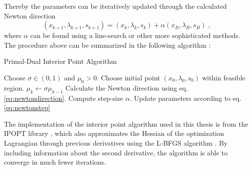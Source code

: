 Thereby the parameters can be iteratively updated through the calculated Newton direction
\begin{equation}
	(x_{k+1} , \lambda_{k+1} , s _{k+1}) = (x_{k} , \lambda_{k} , s _{k}) + \alpha  (x_B , \lambda_B , s_B) \; , \label{eq:newtonstep}
\end{equation}
where $\alpha$ can be found using a line-search or other more sophisticated methods.
The procedure above can be summarized in the following algorithm \cite{ipnote}:\\
\begin{algorithm}
\begin{algorithmic}
\caption{Primal-Dual Interior Point Algorithm}
\State Choose $\sigma \in (0,1)$ and $\mu_0 > 0$.
\State Choose initial point $(x_0 , \lambda_0 , s_0)$ within feasible region.
	\State $\mu_k \gets \sigma \mu_{k-1}$
	\State Calculate the Newton direction using eq. \eqref{eq:newtondirection}.
	\State Compute step-size $\alpha$.
	\State Update parameters according to eq. \eqref{eq:newtonstep}
\EndFor
\end{algorithmic}
\end{algorithm}

The implementation of the interior point algorithm used in this thesis is from the IPOPT library \cite{Wachter2006}, which also approximates the Hessian of the optimization Lagrangian through previous derivatives using the L-BFGS algorithm \cite{Liu1989}. By including information about the second derivative, the algorithm is able to converge in much fewer iterations. 


